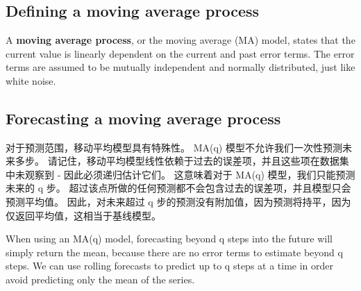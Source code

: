 \chapter{\label{ch04}}
\section{Defining a moving average process}
A \textbf{moving average process}, or the moving average (MA) model, states that the current value is linearly dependent on the current and past error terms. The error terms are assumed to be mutually independent and normally distributed, just like white noise.
\section{Forecasting a moving average process}
对于预测范围，移动平均模型具有特殊性。 MA(q) 模型不允许我们一次性预测未来多步。 请记住，移动平均模型线性依赖于过去的误差项，并且这些项在数据集中未观察到 - 因此必须递归估计它们。 这意味着对于 MA(q) 模型，我们只能预测未来的 q 步。 超过该点所做的任何预测都不会包含过去的误差项，并且模型只会预测平均值。 因此，对未来超过 q 步的预测没有附加值，因为预测将持平，因为仅返回平均值，这相当于基线模型。
\begin{tcolorbox}[title=Forecasting using the MA(q) model]
    When using an MA(q) model, forecasting beyond q steps into the future will simply return the mean, because there are no error terms to estimate beyond q steps. We can use rolling forecasts to predict up to q steps at a time in order avoid predicting only the mean of the series.
\end{tcolorbox}